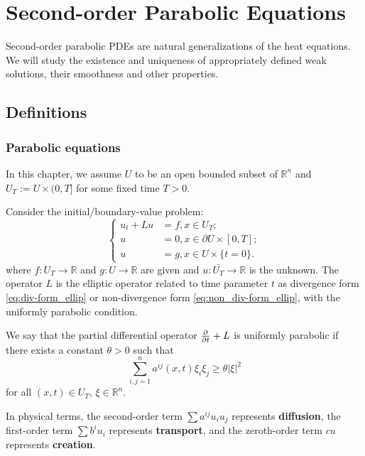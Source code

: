 \section{Second-order Parabolic Equations}
Second-order parabolic PDEs are natural generalizations of the heat equations. We will study the existence and uniqueness of appropriately defined weak solutions, their smoothness and other properties.
\subsection{Definitions}
\subsubsection{Parabolic equations}
In this chapter, we assume $U$ to be an open bounded subset of $\mathbb{R}^{n}$ and $U_{T}:=U\times(0,T]$ for some fixed time $T>0$.

Consider the initial/boundary-value problem:
\begin{equation}
    \label{eq:Parabolic_IBVP}
    \left\{
        \begin{aligned}
            u_{t}+Lu&=f,x\in U_{T};\\
            u&=0,x\in \partial U\times[0,T];\\
            u&=g,x\in U\times\{t=0\}.
        \end{aligned}
    \right.
\end{equation}
where $f:U_{T}\rightarrow\mathbb{R}$ and $g:U\rightarrow\mathbb{R}$ are given and $u:\bar{U_{T}}\rightarrow\mathbb{R}$ is the unknown. The operator $L$ is the elliptic operator related to time parameter $t$ as divergence form \eqref{eq:div-form_ellip} or non-divergence form \eqref{eq:non_div-form_ellip}, with the uniformly parabolic condition.
\begin{definition}
    We say that the partial differential operator $\frac{\partial }{\partial t}+L$ is uniformly parabolic if there exists a constant $\theta>0$ such that 
    \begin{equation}
        \sum_{i,j=1}^{n}a^{ij}(x,t)\xi_{i}\xi_{j}\ge \theta|\xi|^{2}
    \end{equation}
    for all $(x,t)\in U_{T}$, $\xi\in\mathbb{R}^{n}$.
\end{definition}
In physical terms, the second-order term $\sum a^{ij}u_{i}u_{j}$ represents \textbf{diffusion}, the first-order term $\sum b^{i}u_{i}$ represents \textbf{transport}, and the zeroth-order term $cu$ represents \textbf{creation}.
